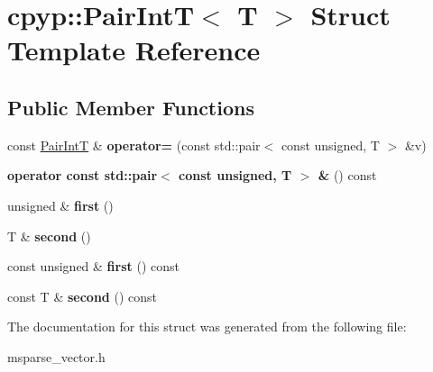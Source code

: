 \hypertarget{structcpyp_1_1_pair_int_t}{}\section{cpyp\+:\+:Pair\+IntT$<$ T $>$ Struct Template Reference}
\label{structcpyp_1_1_pair_int_t}
\subsection*{Public Member Functions}
\begin{DoxyCompactItemize}
\item 
\mbox{\label{structcpyp_1_1_pair_int_t_a4e08e7614633c8c37f1a325e9b674356}} 
const \mbox{\hyperlink{structcpyp_1_1_pair_int_t}{Pair\+IntT}} \& {\bfseries operator=} (const std\+::pair$<$ const unsigned, T $>$ \&v)
\item 
\mbox{\label{structcpyp_1_1_pair_int_t_a45cc2a19d5595d59efffff0aa848a548}} 
{\bfseries operator const std\+::pair$<$ const unsigned, T $>$ \&} () const
\item 
\mbox{\label{structcpyp_1_1_pair_int_t_a32f82d1d08e5c4a69520dee4051c3792}} 
unsigned \& {\bfseries first} ()
\item 
\mbox{\label{structcpyp_1_1_pair_int_t_a32adb1aa9d8c8b2588ad3d52c3461e22}} 
T \& {\bfseries second} ()
\item 
\mbox{\label{structcpyp_1_1_pair_int_t_a6229ee64da435cab964d1bed44404689}} 
const unsigned \& {\bfseries first} () const
\item 
\mbox{\label{structcpyp_1_1_pair_int_t_adf508769b7196ef9aac4c35a92350985}} 
const T \& {\bfseries second} () const
\end{DoxyCompactItemize}


The documentation for this struct was generated from the following file\+:\begin{DoxyCompactItemize}
\item 
msparse\+\_\+vector.\+h\end{DoxyCompactItemize}
